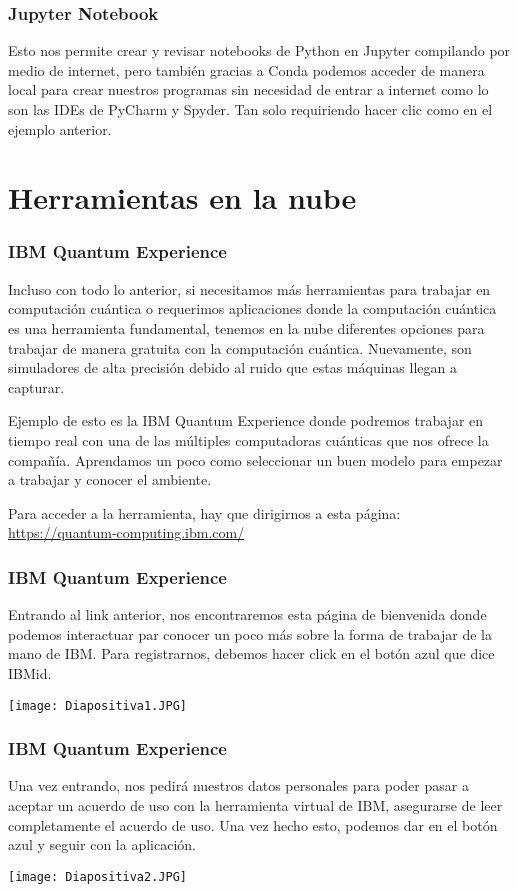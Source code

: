 \documentclass[spanish]{beamer}
\begin{document}
 \newpage\setlength{\parskip}{1mm}
 \begin{frame}[fragile]
 \frametitle{Jupyter Notebook} 
 \justify 
Esto nos permite crear y revisar notebooks de Python en Jupyter compilando por medio de internet, pero también gracias a Conda podemos acceder de manera local para crear nuestros programas sin necesidad de entrar a internet como lo son las IDEs de PyCharm y Spyder. Tan solo requiriendo hacer clic como en el ejemplo anterior.
\end{frame}

\section{Herramientas en la nube}        
 \setlength{\parskip}{1mm}
 \begin{frame}[fragile]
 \frametitle{IBM Quantum Experience} 
 \justify    
 Incluso con todo lo anterior, si necesitamos más herramientas para trabajar en computación cuántica o requerimos aplicaciones donde la computación cuántica es una herramienta fundamental, tenemos en la nube diferentes opciones para trabajar de manera gratuita con la computación cuántica. Nuevamente, son simuladores de alta precisión debido al ruido que estas máquinas llegan a capturar.
 
 Ejemplo de esto es la IBM Quantum Experience donde podremos trabajar en tiempo real con una de las múltiples computadoras cuánticas que nos ofrece la compañía. Aprendamos un poco como seleccionar un buen modelo para empezar a trabajar y conocer el ambiente.
 
 Para acceder a la herramienta, hay que dirigirnos a esta página:  \url{https://quantum-computing.ibm.com/}

 \end{frame}
 
 \newpage\begin{frame}
 \frametitle{IBM Quantum Experience} 
 \justify 
Entrando al link anterior, nos encontraremos esta página de bienvenida donde podemos interactuar par conocer un poco más sobre la forma de trabajar de la mano de IBM. Para registrarnos, debemos hacer click en el botón azul que dice IBMid.
 
 \centering\texttt{[image: Diapositiva1.JPG]}
 \end{frame}
 
 \newpage\begin{frame}
 \frametitle{IBM Quantum Experience} 
 \justify 
 Una vez entrando, nos pedirá nuestros datos personales para poder pasar a aceptar un acuerdo de uso con la herramienta virtual de IBM, asegurarse de leer completamente el acuerdo de uso. Una vez hecho esto, podemos dar en el botón azul y seguir con la aplicación.
 
 \centering\texttt{[image: Diapositiva2.JPG]}
 \end{frame}
 
\end{document}
